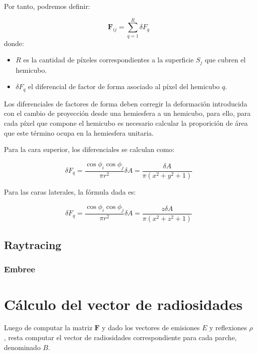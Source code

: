 Por tanto, podremos definir:

\begin{equation}
	\mathbf{F}_{ij} = \sum_{q=1}^{R} \delta{F_{q}}
	\label{eq:ffgreenberg}
\end{equation}
donde:
\begin{itemize}
	\item $R$ es la cantidad de píxeles correspondientes a la superficie $S_{j}$ que cubren el hemicubo.
	\item $\delta{F_{q}}$ el diferencial de factor de forma asociado al píxel del hemicubo $q$.
\end{itemize}

Los diferenciales de factores de forma deben corregir la deformación introducida con el cambio de proyección desde una hemiesfera a un hemicubo, para ello, para cada píxel que compone el hemicubo es necesario calcular la proporición de área que este término ocupa en la hemiesfera unitaria.

Para la cara superior, los diferenciales se calculan como:

\begin{equation}
	\delta{F_{q}} = \frac{\cos{\phi_{i}}\cos{\phi_{j}}}{\pi{r^{2}}} \delta{A} = \frac{\delta{A}}{\pi({x^{2} + y^{2} + 1})} 
\end{equation}

Para las caras laterales, la fórmula dada es:

\begin{equation}
\delta{F_{q}} = \frac{\cos{\phi_{i}}\cos{\phi_{j}}}{\pi{r^{2}}}\delta{A} = \frac{z\delta{A}}{\pi({x^{2} + z^{2} + 1})}
\end{equation}


\subsection{Raytracing}
\label{sec:raytracing}

\subsubsection{Embree}
\label{sec:embree}

\section{Cálculo del vector de radiosidades}

Luego de computar la matriz $\mathbf{F}$ y dado los vectores de emisiones $E$ y reflexiones $\rho$, resta computar el vector de radiosidades correspondiente para cada parche, denominado $B$.

